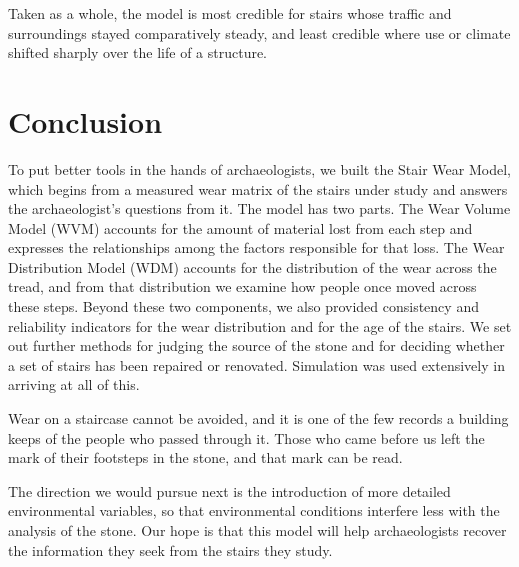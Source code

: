 Taken as a whole, the model is most credible for stairs whose traffic and surroundings stayed comparatively steady, and least credible where use or climate shifted sharply over the life of a structure.

\section{Conclusion}

To put better tools in the hands of archaeologists, we built the Stair Wear Model, which begins from a measured wear matrix of the stairs under study and answers the archaeologist's questions from it. The model has two parts. The Wear Volume Model (WVM) accounts for the amount of material lost from each step and expresses the relationships among the factors responsible for that loss. The Wear Distribution Model (WDM) accounts for the distribution of the wear across the tread, and from that distribution we examine how people once moved across these steps. Beyond these two components, we also provided consistency and reliability indicators for the wear distribution and for the age of the stairs. We set out further methods for judging the source of the stone and for deciding whether a set of stairs has been repaired or renovated. Simulation was used extensively in arriving at all of this.

Wear on a staircase cannot be avoided, and it is one of the few records a building keeps of the people who passed through it. Those who came before us left the mark of their footsteps in the stone, and that mark can be read.

The direction we would pursue next is the introduction of more detailed environmental variables, so that environmental conditions interfere less with the analysis of the stone. Our hope is that this model will help archaeologists recover the information they seek from the stairs they study.
